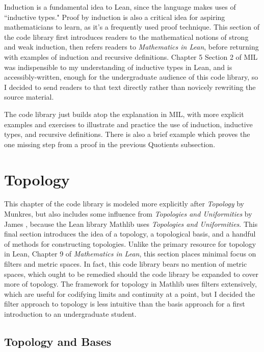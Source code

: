 Induction is a fundamental idea to Lean, since the language makes uses of
``inductive types." Proof by induction is also a critical idea for aspiring 
mathematicians to learn, as it's a frequently used proof technique. This
section of the code library first introduces readers to the mathematical notions
of strong and weak induction, then refers readers to \textit{Mathematics in Lean},
before returning with examples of induction and recursive definitions. Chapter 
5 Section 2 of MIL was indispensible to my understanding of inductive types in 
Lean, and is accessibly-written, enough for the undergraduate audience of this
code library, so I decided to send readers to that text directly rather than 
novicely rewriting the source material. 

The code library just builds atop the explanation in MIL, with more explicit 
examples and exercises to illustrate and practice the use of induction, 
inductive types, and recursive definitions. There is also a brief example
which proves the one missing step from a proof in the previous Quotients 
subsection.

\section{Topology}

This chapter of the code library is modeled more explicitly after 
\textit{Topology} by Munkres, but also includes
some influence from \textit{Topologies and Uniformities}
by James \cite{Uniform}, because 
the Lean library Mathlib uses \textit{Topologies and Uniformities}.
This final section introduces the idea of a topology, a topological basis,
and a handful of methods for constructing topologies. Unlike the primary 
resource for topology in Lean, Chapter 9 of \textit{Mathematics in Lean}, 
this section places minimal focus on filters and metric spaces. In fact, 
this code library bears no mention of metric spaces, which ought to
be remedied should the code library be expanded to cover more of topology.
The framework for topology in Mathlib uses filters extensively, which
are useful for codifying limits and continuity at a point, but I decided 
the filter approach to topology is less intuitive than the basis 
approach for a first introduction to an undergraduate student.

\subsection{Topology and Bases}

